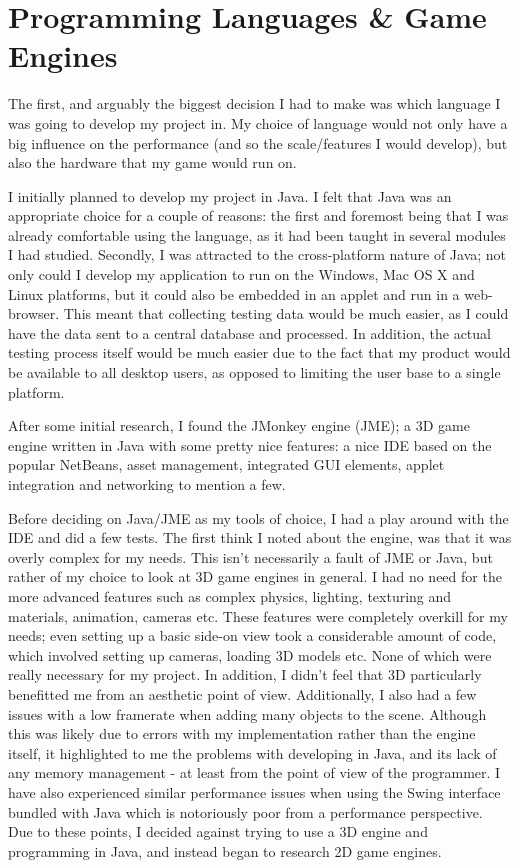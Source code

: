 \documentclass[a4paper,oneside]{report}
\begin{document}
\section{Programming Languages \& Game Engines}

The first, and arguably the biggest decision I had to make was which language I was going to develop my project in. My choice of language would not only have a big influence on the performance (and so the scale/features I would develop), but also the hardware that my game would run on.  

I initially planned to develop my project in Java. I felt that Java was an appropriate choice for a couple of reasons: the first and foremost being that I was already comfortable using the language, as it had been taught in several modules I had studied. Secondly, I was attracted to the cross-platform nature of Java; not only could I develop my application to run on the Windows, Mac OS X and Linux platforms, but it could also be embedded in an applet and run in a web-browser. This meant that collecting testing data would be much easier, as I could have the data sent to a central database and processed. In addition, the actual testing process itself would be much easier due to the fact that my product would be available to all desktop users, as opposed to limiting the user base to a single platform.

After some initial research, I found the JMonkey engine (JME); a 3D game engine written in Java with some pretty nice features: a nice IDE based on the popular NetBeans, asset management, integrated GUI elements, applet integration and networking to mention a few. 

Before deciding on Java/JME as my tools of choice, I had a play around with the IDE and did a few tests. The first think I noted about the engine, was that it was overly complex for my needs. This isn't necessarily a fault of JME or Java, but rather of my choice to look at 3D game engines in general. I had no need for the more advanced features such as complex physics, lighting, texturing and materials, animation, cameras etc. These features were completely overkill for my needs; even setting up a basic side-on view took a considerable amount of code, which involved setting up cameras, loading 3D models etc. None of which were really necessary for my project. In addition, I didn't feel that 3D particularly benefitted me from an aesthetic point of view. Additionally, I also had a few issues with a low framerate when adding many objects to the scene. Although this was likely due to errors with my implementation rather than the engine itself, it highlighted to me the problems with developing in Java, and its lack of any memory management - at least from the point of view of the programmer. I have also experienced similar performance issues when using the Swing interface bundled with Java which is notoriously poor from a performance perspective. Due to these points, I decided against trying to use a 3D engine and programming in Java, and instead began to research 2D game engines.
\end{document}
